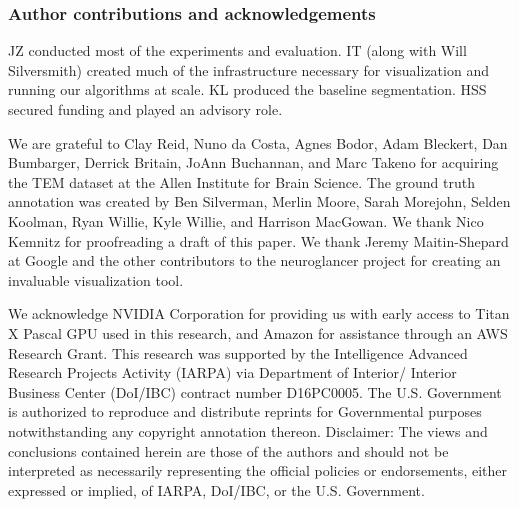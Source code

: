 \documentclass{article}
\begin{document}


\subsubsection*{Author contributions and acknowledgements}
JZ conducted most of the experiments and evaluation. IT (along with Will
Silversmith) created much of the infrastructure necessary for visualization and
running our algorithms at scale. KL produced the baseline segmentation. HSS
secured funding and played an advisory role.

We are grateful to Clay Reid, Nuno da Costa, Agnes Bodor, Adam Bleckert, Dan Bumbarger, Derrick Britain, JoAnn Buchannan, and Marc Takeno for acquiring the TEM dataset at the Allen Institute for Brain Science.
The ground truth annotation was created by Ben Silverman, Merlin Moore, Sarah Morejohn, Selden Koolman, Ryan Willie, Kyle Willie, and Harrison MacGowan.
We thank Nico Kemnitz for proofreading a draft of this paper. We thank
Jeremy Maitin-Shepard at Google and the other contributors to the neuroglancer project for creating an invaluable visualization tool.

We acknowledge NVIDIA Corporation for providing us with early access to Titan X
Pascal GPU used in this research, and Amazon for assistance through an AWS Research Grant. This research was supported by the Intelligence Advanced
Research Projects Activity (IARPA) via Department of Interior/ Interior Business Center (DoI/IBC)
contract number D16PC0005. The U.S. Government is authorized to reproduce and distribute reprints
for Governmental purposes notwithstanding any copyright annotation thereon. Disclaimer: The views
and conclusions contained herein are those of the authors and should not be interpreted as necessarily
representing the official policies or endorsements, either expressed or implied, of IARPA, DoI/IBC,
or the U.S. Government.


\end{document}

